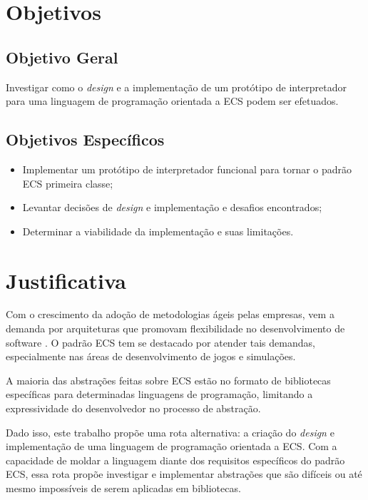 \section{Objetivos} \label{sec:objetivos}

\subsection{Objetivo Geral} \label{sec:obj_geral}

Investigar como o \textit{design} e a implementação de um protótipo de interpretador para uma linguagem de programação orientada a ECS podem ser efetuados.

\subsection{Objetivos Específicos}

\begin{itemize}
    \item Implementar um protótipo de interpretador funcional para tornar o padrão ECS primeira classe;
    \item Levantar decisões de \textit{design} e implementação e desafios encontrados;
    \item Determinar a viabilidade da implementação e suas limitações.
\end{itemize}

\section{Justificativa} \label{sec:justificativa}

Com o crescimento da adoção de metodologias ágeis pelas empresas, vem a demanda por arquiteturas que promovam flexibilidade no desenvolvimento de software \cite{flightdynamics}. O padrão ECS tem se destacado por atender tais demandas, especialmente nas áreas de desenvolvimento de jogos e simulações.

A maioria das abstrações feitas sobre ECS estão no formato de bibliotecas específicas para determinadas linguagens de programação, limitando a expressividade do desenvolvedor no processo de abstração.

Dado isso, este trabalho propõe uma rota alternativa: a criação do \textit{design} e implementação de uma linguagem de programação orientada a ECS. Com a capacidade de moldar a linguagem diante dos requisitos específicos do padrão ECS, essa rota propõe investigar e implementar abstrações que são difíceis ou até mesmo impossíveis de serem aplicadas em bibliotecas.
